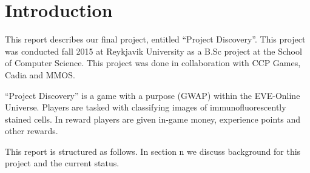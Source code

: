 \section{Introduction}\label{sec:introduction}
This report describes our final project, entitled ``Project Discovery''. This
project was conducted fall 2015 at Reykjavik University as a B.Sc project at
the School of Computer Science. This project was done in collaboration with CCP
Games, Cadia and MMOS.

``Project Discovery'' is a game with a purpose (GWAP) within the EVE-Online
Universe. Players are tasked with classifying images of immunofluorescently
stained cells. In reward players are given in-game money, experience points and
other rewards.

This report is structured as follows. In section n we discuss background for
this project and the current status.

